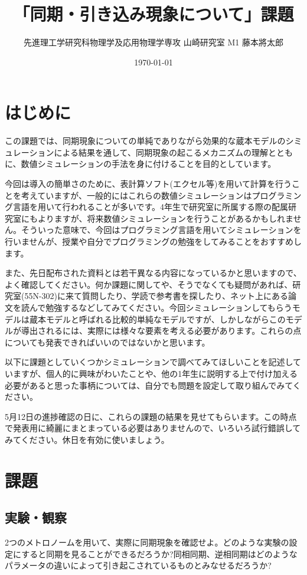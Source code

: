 \documentclass{jsarticle}
\title{「同期・引き込み現象について」課題}
\author{先進理工学研究科物理学及応用物理学専攻 山崎研究室 M1 藤本將太郎}
\date{\today}
\begin{document}
\maketitle

\section{はじめに}
この課題では、同期現象についての単純でありながら効果的な蔵本モデルのシミュレーションによる結果を通して、同期現象の起こるメカニズムの理解とともに、数値シミュレーションの手法を身に付けることを目的としています。

今回は導入の簡単さのために、表計算ソフト(エクセル等)を用いて計算を行うことを考えていますが、一般的にはこれらの数値シミュレーションはプログラミング言語を用いて行われることが多いです。4年生で研究室に所属する際の配属研究室にもよりますが、将来数値シミュレーションを行うことがあるかもしれません。そういった意味で、今回はプログラミング言語を用いてシミュレーションを行いませんが、授業や自分でプログラミングの勉強をしてみることをおすすめします。

また、先日配布された資料とは若干異なる内容になっているかと思いますので、よく確認してください。何か課題に関してや、そうでなくても疑問があれば、研究室(55N-302)に来て質問したり、学読で参考書を探したり、ネット上にある論文を読んで勉強するなどしてみてください。今回シミュレーションしてもらうモデルは蔵本モデルと呼ばれる比較的単純なモデルですが、しかしながらこのモデルが導出されるには、実際には様々な要素を考える必要があります。これらの点についても発表できればいいのではないかと思います。

以下に課題としていくつかシミュレーションで調べてみてほしいことを記述していますが、個人的に興味がわいたことや、他の1年生に説明する上で付け加える必要があると思った事柄については、自分でも問題を設定して取り組んでみてください。

5月12日の進捗確認の日に、これらの課題の結果を見せてもらいます。この時点で発表用に綺麗にまとまっている必要はありませんので、いろいろ試行錯誤してみてください。休日を有効に使いましょう。

\section{課題}
\subsection{実験・観察}
    2つのメトロノームを用いて、実際に同期現象を確認せよ。どのような実験の設定にすると同期を見ることができるだろうか?同相同期、逆相同期はどのようなパラメータの違いによって引き起こされているものとみなせるだろうか?
\end{document}
